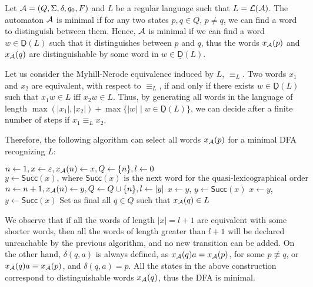 \documentclass{article}
\newcommand{\Succ}[1]{\mathsf{Succ}(#1)}
\newcommand{\distmin}[1]{\underline{\mathsf{D}}(#1)}
\begin{document}
Let ${\cal A}=(Q,\Sigma,\delta,q_0,F)$ and $L$ be a regular language such that $L=\mathcal{L}({\cal A})$.
The automaton ${\cal A}$ is minimal if for any two states $p,q\in Q$, $p\neq q$,
we can find a word to distinguish between them. 
Hence,  ${\cal A}$ is minimal if we can find a word $w\in \distmin{L}$ such that it distinguishes between $p$ and $q$, 
thus the words $x_{\cal A}(p)$ and $x_{\cal A}(q)$ are distinguishable by some word in $w\in \distmin{L}$.

Let us consider the Myhill-Nerode equivalence induced by $L$, $\equiv_L$.
Two words $x_1$ and $x_2$ are equivalent, with respect to $\equiv_L$, if and only if there exists
$w\in \distmin{L}$ such that $x_1w\in L$ iff $x_2w\in L$.
Thus, by generating all words in the language of length
$\max(|x_1|,|x_2|)+\max\{|w| \mid w\in \distmin{L}\}$, we can decide 
after a finite number of steps if $x_1\equiv_L x_2$.

Therefore, the following algorithm can select all words $x_{\cal A}(p)$ for a minimal DFA
recognizing $L$:

\begin{algorithmic}[1]
\State $n \gets 1, x \gets \varepsilon, x_{\cal A}(n)\gets x, Q\gets \{n\}, l\gets 0$
\State $y\gets\Succ{x}\text{, where $\Succ{x}$ is the next word for the quasi-lexicographical order}$
        \State $n\gets n+1, x_{\cal A}(n)\gets y, Q\gets Q\cup\{n\}, l\gets|y|$
    \Else 
    \EndIf
    \State $x\gets y$, $y\gets\Succ{x}$
    \label{checkReachable} 
        \State $x\gets y$, $y\gets\Succ{x}$
    \EndWhile
\EndWhile
\State Set as final all $q\in Q$ such that $x_{\cal A}(q)\in L$
\end{algorithmic}



We observe that if all the words of length $|x|=l+1$ are equivalent 
with some shorter words,
then all the words of length  greater than $l+1$ will be declared unreachable by the previous algorithm, 
and no new transition can be added.
On the other hand, $\delta(q,a)$ is always defined, as $x_{\cal A}(q)a=x_{\cal A}(p)$, for some $p\not\equiv q$, or
$x_{\cal A}(q)a\equiv x_{\cal A}(p)$, and $\delta(q,a)=p$.
All the states in the above construction correspond to distinguishable words $x_{\cal A}(q)$,
 thus the DFA is minimal.
\end{document}
